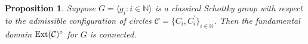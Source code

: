 \documentclass[12pt]{amsart}
\theoremstyle{plain}
\newtheorem{prop}[thm]{Proposition}
\DeclareMathOperator{\Ext}{\rm Ext}
\begin{document}
\begin{prop} \label{prop: basics1}  Suppose 
  $G =\langle g_i :i \in \mathbb N\rangle$ is a classical Schottky group with respect to 
  the admissible configuration of  circles $\mathcal{C}=\{C_i ,C_i ^{\prime}\}_{i \in \mathbb N}$. Then the fundamental domain $\Ext (\mathcal{C})^{\circ}$ for $G$ is connected.
\end{prop}
 
\end{document}
